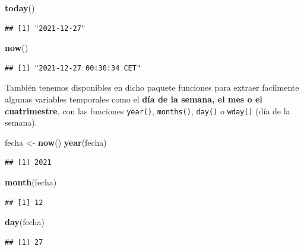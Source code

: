\documentclass[11pt,]{book}
\newenvironment{Shaded}{\begin{snugshade}}{\end{snugshade}}
\newcommand{\KeywordTok}[1]{\textcolor[rgb]{0.27,0.27,0.27}{\textbf{#1}}}
\newcommand{\NormalTok}[1]{#1}
\newcommand{\StringTok}[1]{\textcolor[rgb]{0.5,0.5,0.5}{#1}}
\begin{document}
\begin{Shaded}
\begin{Highlighting}[]
\KeywordTok{today}\NormalTok{()}
\end{Highlighting}
\end{Shaded}

\begin{verbatim}
## [1] "2021-12-27"
\end{verbatim}

\begin{Shaded}
\begin{Highlighting}[]
\KeywordTok{now}\NormalTok{()}
\end{Highlighting}
\end{Shaded}

\begin{verbatim}
## [1] "2021-12-27 00:30:34 CET"
\end{verbatim}

También tenemos disponibles en dicho paquete funciones para extraer facilmente algunas variables temporales como el \textbf{día de la semana, el mes o el cuatrimestre}, con las funciones \texttt{year()}, \texttt{months()}, \texttt{day()} o \texttt{wday()} (día de la semana).

\begin{Shaded}
\begin{Highlighting}[]
\NormalTok{fecha <-}\StringTok{ }\KeywordTok{now}\NormalTok{()}
\KeywordTok{year}\NormalTok{(fecha)}
\end{Highlighting}
\end{Shaded}

\begin{verbatim}
## [1] 2021
\end{verbatim}

\begin{Shaded}
\begin{Highlighting}[]
\KeywordTok{month}\NormalTok{(fecha)}
\end{Highlighting}
\end{Shaded}

\begin{verbatim}
## [1] 12
\end{verbatim}

\begin{Shaded}
\begin{Highlighting}[]
\KeywordTok{day}\NormalTok{(fecha)}
\end{Highlighting}
\end{Shaded}

\begin{verbatim}
## [1] 27
\end{verbatim}
\end{document}
